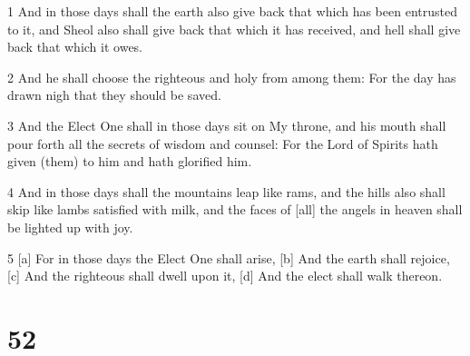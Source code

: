 \par 1 And in those days shall the earth also give back that which has been entrusted to it, and Sheol also shall give back that which it has received, and hell shall give back that which it owes.
\par 2 And he shall choose the righteous and holy from among them: For the day has drawn nigh that they should be saved.
\par 3 And the Elect One shall in those days sit on My throne, and his mouth shall pour forth all the secrets of wisdom and counsel: For the Lord of Spirits hath given (them) to him and hath glorified him.
\par 4 And in those days shall the mountains leap like rams, and the hills also shall skip like lambs satisfied with milk, and the faces of [all] the angels in heaven shall be lighted up with joy.
\par 5 [a] For in those days the Elect One shall arise, [b] And the earth shall rejoice, [c] And the righteous shall dwell upon it, [d] And the elect shall walk thereon.

\chapter{52}

